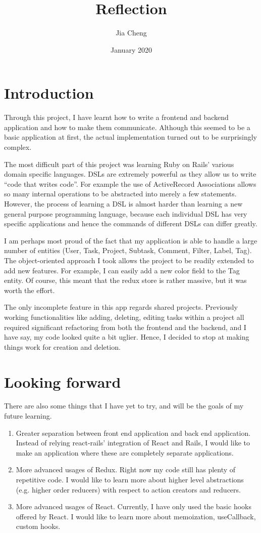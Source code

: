 \documentclass{article}
\title{Reflection}
\author{Jia Cheng}
\date{January 2020}
\begin{document}
\maketitle


\section{Introduction}
Through this project, I have learnt how to write a frontend and backend application and how to make them communicate. Although this seemed to be a basic application at first, the actual implementation turned out to be surprisingly complex. 

The most difficult part of this project was learning Ruby on Rails’ various domain specific languages. DSLs are extremely powerful as they allow us to write “code that writes code”. For example the use of ActiveRecord Associations allows so many internal operations to be abstracted into merely a few statements. However, the process of learning a DSL is almost harder than learning a new general purpose programming language, because each individual DSL has very specific applications and hence the commands of different DSLs can differ greatly.

I am perhaps most proud of the fact that my application is able to handle a large number of entities (User, Task, Project, Subtask, Comment, Filter, Label, Tag). The object-oriented approach I took allows the project to be readily extended to add new features. For example, I can easily add a new color field to the Tag entity. Of course, this meant that the redux store is rather massive, but it was worth the effort.

The only incomplete feature in this app regards shared projects. Previously working functionalities like adding, deleting, editing tasks within a project all required significant refactoring from both the frontend and the backend, and I have say, my code looked quite a bit uglier. Hence, I decided to stop at making things work for creation and deletion.


\section{Looking forward}
There are also some things that I have yet to try, and will be the goals of my future learning.
\begin{enumerate}
  \item Greater separation between front end application and back end application. Instead of relying react-rails’ integration of React and Rails, I would like to make an application where these are completely separate applications.
  \item More advanced usages of Redux. Right now my code still has plenty of repetitive code. I would like to learn more about higher level abstractions (e.g. higher order reducers) with respect to action creators and reducers.
  \item More advanced usages of React. Currently, I have only used the basic hooks offered by React. I would like to learn more about memoization, useCallback, custom hooks.
\end{enumerate}
\end{document}
